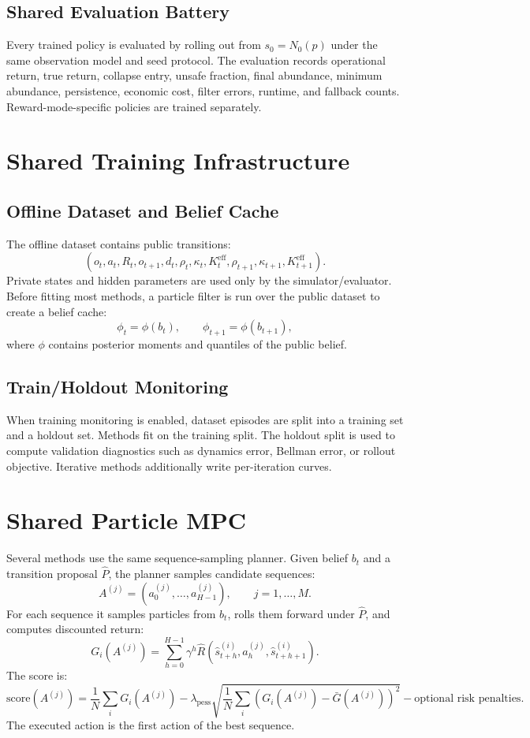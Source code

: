 \documentclass[11pt]{article}
\newcommand{\1}{\mathbf{1}}
\begin{document}
\subsection{Shared Evaluation Battery}

Every trained policy is evaluated by rolling out from $s_0=N_0(p)$ under the
same observation model and seed protocol.  The evaluation records operational
return, true return, collapse entry, unsafe fraction, final abundance, minimum
abundance, persistence, economic cost, filter errors, runtime, and fallback
counts.  Reward-mode-specific policies are trained separately.

\section{Shared Training Infrastructure}

\subsection{Offline Dataset and Belief Cache}

The offline dataset contains public transitions:
\[
  (o_t,a_t,R_t,o_{t+1},d_t,\rho_t,\kappa_t,K^{\mathrm{eff}}_t,
   \rho_{t+1},\kappa_{t+1},K^{\mathrm{eff}}_{t+1}).
\]
Private states and hidden parameters are used only by the simulator/evaluator.
Before fitting most methods, a particle filter is run over the public dataset to
create a belief cache:
\[
  \phi_t=\phi(b_t),\qquad \phi_{t+1}=\phi(b_{t+1}),
\]
where $\phi$ contains posterior moments and quantiles of the public belief.

\subsection{Train/Holdout Monitoring}

When training monitoring is enabled, dataset episodes are split into a training
set and a holdout set.  Methods fit on the training split.  The holdout split is
used to compute validation diagnostics such as dynamics error, Bellman error, or
rollout objective.  Iterative methods additionally write per-iteration curves.

\section{Shared Particle MPC}

Several methods use the same sequence-sampling planner.  Given belief $b_t$ and
a transition proposal $\hat{P}$, the planner samples candidate sequences:
\[
  A^{(j)}=(a^{(j)}_0,\ldots,a^{(j)}_{H-1}),\qquad j=1,\ldots,M.
\]
For each sequence it samples particles from $b_t$, rolls them forward under
$\hat{P}$, and computes discounted return:
\[
  G_i(A^{(j)})=\sum_{h=0}^{H-1}\gamma^h
  \hat{R}(\hat{s}^{(i)}_{t+h},a^{(j)}_h,\hat{s}^{(i)}_{t+h+1}).
\]
The score is:
\[
  \mathrm{score}(A^{(j)})
  =
  \frac{1}{N}\sum_iG_i(A^{(j)})
  -\lambda_{\mathrm{pess}}\sqrt{\frac{1}{N}\sum_i
      \left(G_i(A^{(j)})-\bar{G}(A^{(j)})\right)^2}
  -\text{optional risk penalties}.
\]
The executed action is the first action of the best sequence.
\end{document}
